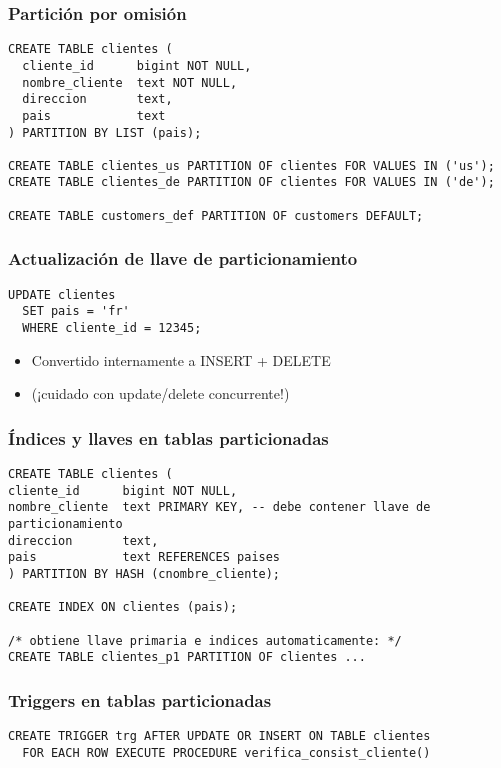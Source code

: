 \begin{frame}[fragile]
\frametitle{Partición por omisión}

\footnotesize
\begin{lstlisting}
CREATE TABLE clientes (
  cliente_id      bigint NOT NULL,
  nombre_cliente  text NOT NULL,
  direccion       text,
  pais            text
) PARTITION BY LIST (pais);

CREATE TABLE clientes_us PARTITION OF clientes FOR VALUES IN ('us');
CREATE TABLE clientes_de PARTITION OF clientes FOR VALUES IN ('de');

CREATE TABLE customers_def PARTITION OF customers DEFAULT;
\end{lstlisting}

\end{frame}

\begin{frame}[fragile]
\frametitle{Actualización de llave de particionamiento}

\footnotesize
\begin{lstlisting}
UPDATE clientes
  SET pais = 'fr'
  WHERE cliente_id = 12345;
\end{lstlisting}

\begin{itemize}
\item Convertido internamente a INSERT + DELETE
\item (¡cuidado con update/delete concurrente!)
\end{itemize}
\end{frame}

\begin{frame}[fragile]
\frametitle{Índices y llaves en tablas particionadas}

\footnotesize
\begin{lstlisting}
CREATE TABLE clientes (
cliente_id      bigint NOT NULL,
nombre_cliente  text PRIMARY KEY, -- debe contener llave de particionamiento
direccion       text,
pais            text REFERENCES paises
) PARTITION BY HASH (cnombre_cliente);

CREATE INDEX ON clientes (pais);

/* obtiene llave primaria e indices automaticamente: */
CREATE TABLE clientes_p1 PARTITION OF clientes ...

\end{lstlisting}
\end{frame}

\begin{frame}[fragile]
\frametitle{Triggers en tablas particionadas}

\footnotesize
\begin{lstlisting}
CREATE TRIGGER trg AFTER UPDATE OR INSERT ON TABLE clientes
  FOR EACH ROW EXECUTE PROCEDURE verifica_consist_cliente()
\end{lstlisting}

\end{frame}

